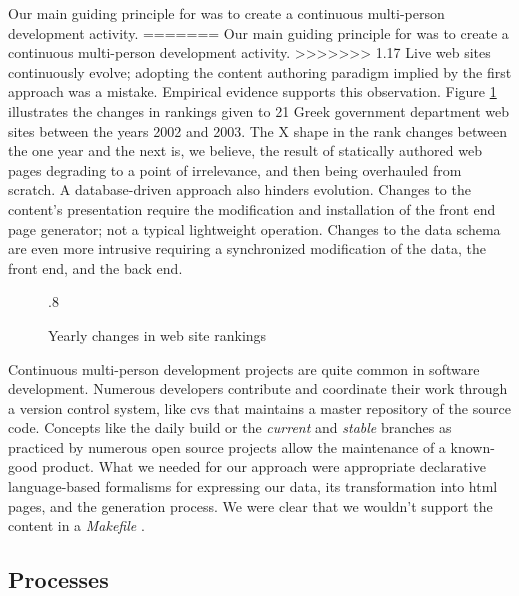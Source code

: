 \documentclass[10pt]{article}
\def\epsfsize#1#2{\ifdim#1>\columnwidth\columnwidth\else#1\fi}
\begin{document}
Our main guiding principle for was to create a continuous multi-person 
development activity.
=======
Our main guiding principle for was to create a continuous multi-person development activity.
>>>>>>> 1.17
Live web sites continuously evolve;
adopting the content authoring paradigm implied
by the first approach was a mistake.
Empirical evidence supports this observation.
Figure \ref{fig:rankyear} illustrates the changes
in rankings given to 21 Greek government department
web sites between the years 2002 and 2003.
The X shape in the rank changes between the one year and the next
is, we believe, the result of statically authored web pages
degrading to a point of irrelevance, and then being overhauled
from scratch.
A database-driven approach also hinders evolution.
Changes to the content's presentation require the modification
and installation of the front end page generator;
not a typical lightweight operation.
Changes to the data schema are even more intrusive
requiring a synchronized modification of the data,
the front end, and the back end.

\label{sec:design}
\begin{figure}[h!]
\begin{center}
\leavevmode
\def\epsfsize#1#2{\epsfxsize}
\epsfysize.8\vsize
{}
\end{center}
\caption{Yearly changes in web site rankings}
\label{fig:rankyear}
\end{figure}

Continuous multi-person development projects are quite
common in software development.
Numerous developers contribute and coordinate their work
through a version control system, like {\sc cvs} that
maintains a master repository of the source code.
Concepts like the daily build \cite{CS95b} or the
{\em current} and {\em stable} branches as practiced by
numerous open source projects allow the maintenance
of a known-good product.
What we needed for our approach were appropriate
declarative language-based formalisms for expressing our data,
its transformation into {\sc html} pages, and the
generation process. We were clear that we wouldn't support the content in a {\em Makefile} \cite{OTT91}.

\subsection{Processes}
\end{document}
